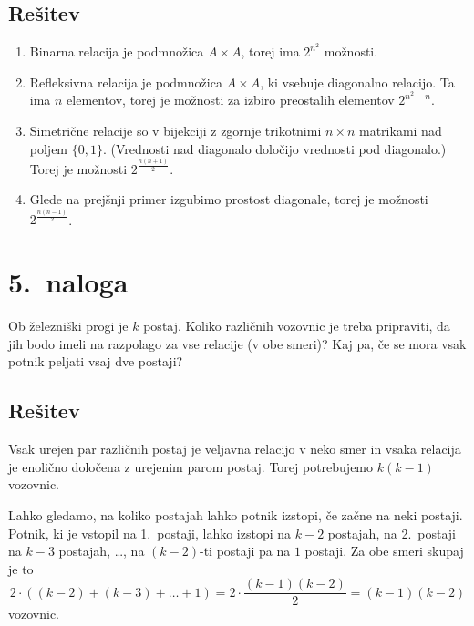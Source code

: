 \documentclass[11pt]{article}
\begin{document}
\subsection*{Rešitev}
    \begin{enumerate}[label = (\alph*)]
        \item Binarna relacija je podmnožica \(A \times A\), torej ima \(2^{n^2}\) možnosti.
        \item Refleksivna relacija je podmnožica \(A \times A\), ki vsebuje diagonalno relacijo. Ta ima \(n\) elementov, torej je možnosti za izbiro preostalih elementov \(2^{n^2 - n}\).
        \item Simetrične relacije so v bijekciji z zgornje trikotnimi \(n \times n\) matrikami nad poljem \(\{0, 1\}\). (Vrednosti nad diagonalo določijo vrednosti pod diagonalo.) 
            Torej je možnosti \(2^{\frac{n(n + 1)}{2}}\).
        \item Glede na prejšnji primer izgubimo prostost diagonale, torej je možnosti \(2^{\frac{n(n - 1)}{2}}\).
    \end{enumerate}

\section*{5.~naloga}
    Ob železniški progi je \(k\) postaj. Koliko različnih vozovnic je treba pripraviti, da jih bodo
    imeli na razpolago za vse relacije (v obe smeri)? Kaj pa, če se mora vsak potnik peljati vsaj
    dve postaji?
\subsection*{Rešitev}
    Vsak urejen par različnih postaj je veljavna relacijo v neko smer in vsaka relacija je enolično določena z urejenim parom postaj. Torej potrebujemo
    \(k\left(k - 1\right)\) vozovnic. 
    
    Lahko gledamo, na koliko postajah lahko potnik izstopi, če začne na neki postaji. Potnik, ki je vstopil na 1.~postaji, lahko izstopi na \(k - 2\) postajah, na 2.~postaji na \(k - 3\) postajah, \ldots,
    na \(\left(k - 2\right)\)-ti postaji pa na \(1\) postaji. Za obe smeri skupaj je to 
    \[2 \cdot \left(\left(k - 2\right) + \left(k - 3\right) + \ldots + 1\right) = 2 \cdot \frac{\left(k - 1\right)\left(k - 2\right)}{2} = \left(k - 1\right)\left(k - 2\right)\] 
    vozovnic.
\end{document}
